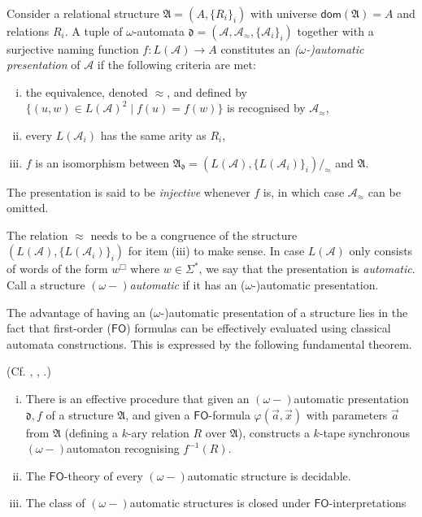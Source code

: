 \documentclass{stacs_proc}
\newcommand{\FO}{\mathsf{FO}}
\newcommand{\dom}{\mathsf{dom}}
\newcommand{\calA}{\mathcal{A}}
\newcommand{\frakd}{\mathfrak{d}}
\newcommand{\frakA}{\mathfrak{A}}
\begin{document}
\begin{definition} \label{def_as} ~\\
Consider a relational structure $\frakA = (A, \{R_i\}_i)$ with universe
$\dom(\frakA) = A$ and relations $R_i$.
A tuple of $\omega$-automata 
$\frakd = (\calA, \calA_\approx, \{\calA_i\}_i)$
together with a surjective naming function $f : L(\calA) \to A$
constitutes an \emph{($\omega$-)automatic presentation} of $\calA$
if the following criteria are met: 
\begin{enumerate}[(i)]
\item the equivalence, denoted $\approx$, and defined by $\{ (u,w) \in L(\calA)^2 \mid f(u) = f(w) \}$ 
   is recognised by $\calA_\approx$,
\item every $L(\calA_i)$ has the same arity as $R_i$,
\item $f$ is an isomorphism between 
   $\frakA_\frakd = (L(\calA), \{L(\calA_i)\}_i) /_{\approx}$ and $\frakA$.
\end{enumerate}
The presentation is said to be \emph{injective} whenever $f$ is, 
in which case $\calA_\approx$ can be omitted.
\end{definition}

The relation $\approx$ needs to be a congruence of the structure 
$(L(\calA), \{L(\calA_i)\}_i)$ for item (iii) to make sense. 
In case $L(\calA)$ only consists of words of the form $w^\Box$ where 
$w \in \Sigma^\ast$, we say that the presentation is {\em automatic}.  
Call a structure {\em $(\omega-)$automatic} if it has an ($\omega$-)automatic 
presentation.








The advantage of having an ($\omega$-)automatic presentation of a structure 
lies in the fact that first-order ($\FO$) formulas can be effectively evaluated
using classical automata constructions. This is expressed by the following 
fundamental theorem.

\begin{theorem} \label{thrm_fo}
   (Cf. \cite{Hod83}, \cite{KN95}, \cite{BG04}.) ~\\[-1 em]
\begin{enumerate}[(i)]
\item There is an effective procedure that given an $(\omega-)$automatic
presentation $\frakd,f$ of a structure $\frakA$, and given a $\FO$-formula
$\varphi(\vec{a},\vec{x})$ with parameters $\vec{a}$ from $\frakA$ (defining a
$k$-ary relation $R$ over $\frakA$), constructs a $k$-tape synchronous
$(\omega-)$automaton recognising $f^{-1}(R)$.

\item The $\FO$-theory of every $(\omega-)$automatic structure is decidable. 
\item The class of $(\omega-)$automatic structures is closed under 
  $\FO$-interpretations 
\end{enumerate}
\end{theorem}
\end{document}

